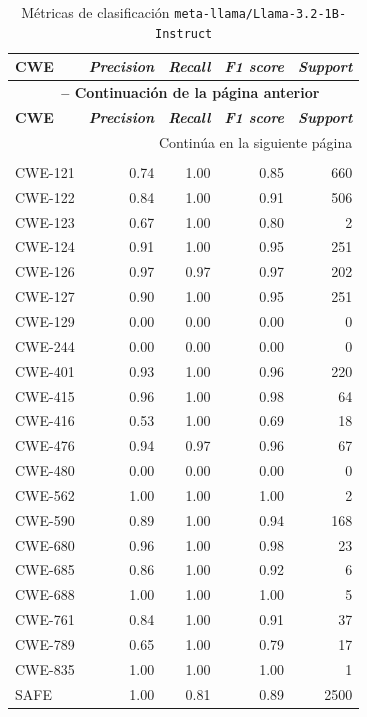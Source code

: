 \documentclass[12pt, a4paper, twoside]{article}
\begin{document}
\begin{longtable}{lrrrr}
	\caption{Métricas de clasificación \texttt{meta-llama/Llama-3.2-1B-Instruct}}
	\label{fig:validation-meta-llama-llama-3_2-1B-instruct-fine-tuned} \\
	\toprule
	\textbf{CWE} & \textbf{\textit{Precision}} & \textbf{\textit{Recall}} & \textbf{\textit{F1 score}} & \textbf{\textit{Support}} \\
	\midrule
	\endfirsthead
	\multicolumn{5}{c}{{\bfseries \tablename\ \thetable{} -- Continuación de la página anterior}} \\
	\toprule
	\textbf{CWE} & \textbf{\textit{Precision}} & \textbf{\textit{Recall}} & \textbf{\textit{F1 score}} & \textbf{\textit{Support}} \\
	\midrule
	\endhead
	\midrule
	\multicolumn{5}{r}{Continúa en la siguiente página} \\
	\endfoot
	\midrule
	\multicolumn{5}{l}{\textbf{\textit{Global Accuracy}:} 0.90 (90\%) -- Total de pruebas: 5.000} \\
	\bottomrule
	\endlastfoot
	CWE-121 &  0.74 & 1.00 & 0.85 &  660 \\
	CWE-122 &  0.84 & 1.00 & 0.91 &  506 \\
	CWE-123 &  0.67 & 1.00 & 0.80 &    2 \\
	CWE-124 &  0.91 & 1.00 & 0.95 &  251 \\
	CWE-126 &  0.97 & 0.97 & 0.97 &  202 \\
	CWE-127 &  0.90 & 1.00 & 0.95 &  251 \\
	CWE-129 &  0.00 & 0.00 & 0.00 &    0 \\
	CWE-244 &  0.00 & 0.00 & 0.00 &    0 \\
	CWE-401 &  0.93 & 1.00 & 0.96 &  220 \\
	CWE-415 &  0.96 & 1.00 & 0.98 &   64 \\
	CWE-416 &  0.53 & 1.00 & 0.69 &   18 \\
	CWE-476 &  0.94 & 0.97 & 0.96 &   67 \\
	CWE-480 &  0.00 & 0.00 & 0.00 &    0 \\
	CWE-562 &  1.00 & 1.00 & 1.00 &    2 \\
	CWE-590 &  0.89 & 1.00 & 0.94 &  168 \\
	CWE-680 &  0.96 & 1.00 & 0.98 &   23 \\
	CWE-685 &  0.86 & 1.00 & 0.92 &    6 \\
	CWE-688 &  1.00 & 1.00 & 1.00 &    5 \\
	CWE-761 &  0.84 & 1.00 & 0.91 &   37 \\
	CWE-789 &  0.65 & 1.00 & 0.79 &   17 \\
	CWE-835 &  1.00 & 1.00 & 1.00 &    1 \\
	SAFE    &  1.00 & 0.81 & 0.89 & 2500 \\
\end{longtable}
\end{document}
